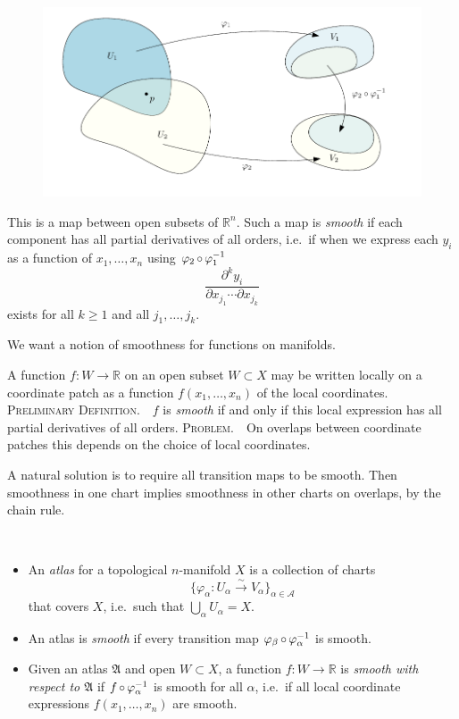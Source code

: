 \documentclass[a4paper,11pt]{article}
\begin{document}
	\begin{figure}[H]
		\centering
		\includegraphics[width=\linewidth]{fig/fig2.pdf}
	\end{figure}
	
	This is a map between open subsets of $\mathbb{R}^n$. Such a map is \emph{smooth} if each component has all partial derivatives of all orders, i.e.\ if when we express each $y_i$ as a function of $x_1, \dots , x_n$ using $\varphi_2 \operatorname{\circ} \varphi_1^{-1}$ 
	\[
		\frac{\partial^k y_i}{\partial x_{j_1} \cdots \partial x_{j_k}}
	\]
	exists for all $k \geq 1$ and all $j_1, \dots , j_k$.

	We want a notion of smoothness for functions on manifolds.

	A function $f: W \to \mathbb{R}$ on an open subset $W \subset X$ may be written locally on a coordinate patch as a function $f(x_1,\dots,x_n)$ of the local coordinates.
	{\large \scshape Preliminary Definition.}\ \ $f$ is \emph{smooth} if and only if this local expression has all partial derivatives of all orders.
	{\large \scshape Problem.}\ \ On overlaps between coordinate patches this depends on the choice of local coordinates.

	A natural solution is to require all transition maps to be smooth. Then smoothness in one chart implies smoothness in other charts on overlaps, by the chain rule.

	\begin{defi} \ 
		\begin{itemize}
			\item An \emph{atlas} for a topological $n$-manifold $X$ is a collection of charts \[
				\{\varphi_\alpha: U_\alpha \xrightarrow{\sim} V_\alpha\}_{\alpha\in \mathcal{A}}
			\]
			that covers $X$, i.e.\ such that $\bigcup_{\alpha} U_\alpha = X$.
			\item An atlas is \emph{smooth} if every transition map $\varphi_\beta \operatorname{\circ} \varphi_\alpha^{-1}$ is smooth.
			\item Given an atlas $\mathfrak{A}$ and open $W \subset X$, a function $f: W \to \mathbb{R}$ is \emph{smooth with respect to $\mathfrak{A}$} if $f \operatorname{\circ} \varphi_\alpha^{-1}$ is smooth for all $\alpha$, i.e.\ if all local coordinate expressions $f(x_1,\dots,x_n)$ are smooth.
		\end{itemize}
	\end{defi}
\end{document}
